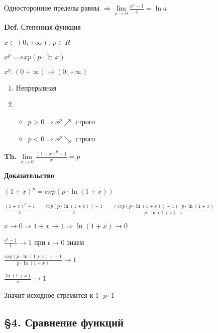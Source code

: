 \documentclass[14pt, letter paper]{article}
\begin{document}
Односторонние пределы равны $\Rightarrow \lim\limits_{x \rightarrow 0}{\frac{a^x-1}{x}} = \ln{a}$

\vspace{5mm}

\textbf{Def.} Степенная функция

$x \in (0; + \infty);\ p \in R$

$x^p = exp(p \cdot \ln{x})$

$x^p : (0 + \infty) \rightarrow (0; + \infty)$

\begin{enumerate}
    \item Непрерывная

    \item \begin{itemize}
        \item $p > 0 \Rightarrow x^p \nearrow$ строго
        \item $p < 0 \Rightarrow x^p \searrow$ строго
    \end{itemize}
\end{enumerate}

\vspace{5mm}

\textbf{Th.} $\lim\limits_{x \rightarrow 0}{\frac{(1+x)^p-1}{x}} = p$

\begin{center}
    \textbf{Доказательство}
\end{center}

$(1 + x)^p = exp(p \cdot \ln{(1+x)})$

$\frac{(1+x)^p-1}{x} = \frac{exp(p \cdot \ln{(1+x)})-1}{x} = \frac{(exp(p \cdot \ln{(1+x)})-1) \cdot p \cdot \ln{(1+x)}}{p \cdot \ln{(1+x)} \cdot x}$

$x \rightarrow 0 \Rightarrow 1 + x \rightarrow 1 \Rightarrow \ln{(1+x)} \rightarrow 0$

$\frac{e^t-1}{t} \rightarrow 1$ при $t \rightarrow 0$ знаем

$\frac{exp(p \cdot \ln{(1+x)})-1}{p \cdot \ln{(1 + x)}} \rightarrow 1$

$\frac{\ln{(1+x)}}{x} \rightarrow 1$

Значит исходное стремится к $1 \cdot p \cdot 1$

\begin{center}
    \subsection*{\S 4. Сравнение функций}
\end{center}
\end{document}
